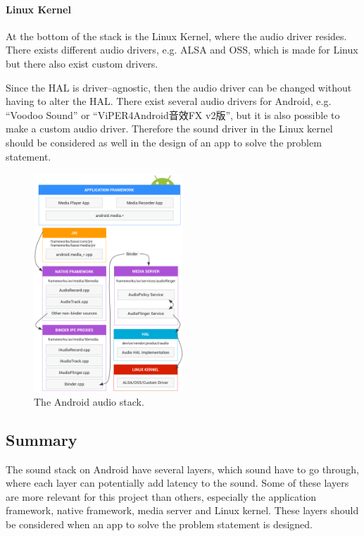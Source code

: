 \paragraph{Linux Kernel}
At the bottom of the stack is the Linux Kernel, where the audio driver resides.
There exists different audio drivers, e.g. \ac{ALSA} and \ac{OSS}, which is made for Linux but there also exist custom drivers.

Since the \ac{HAL} is driver--agnostic, then the audio driver can be changed without having to alter the \ac{HAL}. 
There exist several audio drivers for Android, e.g. ``Voodoo Sound'' or ``ViPER4Android音效FX v2版'',
but it is also possible to make a custom audio driver\cite{voodoo_sound}\cite{viper4_android}.
Therefore the sound driver in the Linux kernel should be considered as well in the design of an app to solve the problem statement.\cite{sound_stack}%

\begin{figure}[!bht]
    \centering
    \includegraphics[width=0.5\textwidth]{img/sound_stack.png}
    \caption{The Android audio stack\cite{sound_stack}.}
    \label{fig:sound_stack}
\end{figure}

\subsection{Summary}
The sound stack on Android have several layers, which sound have to go through,
where each layer can potentially add latency to the sound.
Some of these layers are more relevant for this project than others,
especially the application framework, native framework, media server and Linux kernel.
These layers should be considered when an app to solve the problem statement is designed.


